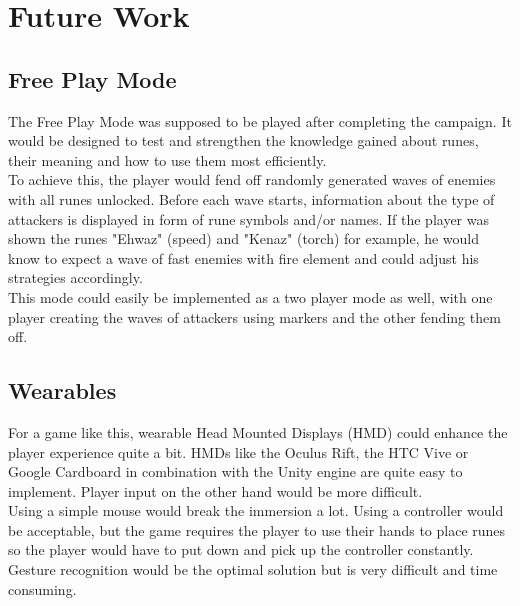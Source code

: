 \section{Future Work}

\subsection{Free Play Mode}

The Free Play Mode was supposed to be played after completing the campaign. It would be designed to test and strengthen the knowledge gained about runes, their meaning and how to use them most efficiently.\\
To achieve this, the player would fend off randomly generated waves of enemies with all runes unlocked. Before each wave starts, information about the type of attackers is displayed in form of rune symbols and/or names. If the player was shown the runes "Ehwaz" (speed) and "Kenaz" (torch) for example, he would know to expect a wave of fast enemies with fire element and could adjust his strategies accordingly.\\
This mode could easily be implemented as a two player mode as well, with one player creating the waves of attackers using markers and the other fending them off.

\subsection{Wearables}

For a game like this, wearable Head Mounted Displays (HMD) could enhance the player experience quite a bit. HMDs like the Oculus Rift, the HTC Vive or Google Cardboard in combination with the Unity engine are quite easy to implement. Player input on the other hand would be more difficult. \\ 
Using a simple mouse would break the immersion a lot. Using a controller would be acceptable, but the game requires the player to use their hands to place runes so the player would have to put down and pick up the controller constantly. Gesture recognition would be the optimal solution but is very difficult and time consuming. 
